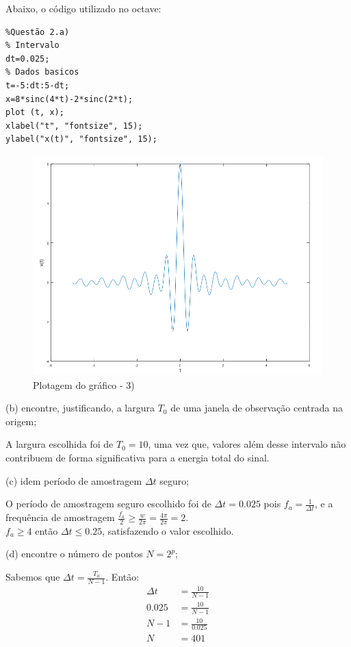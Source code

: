 \documentclass[10pt]{article}
\begin{document}
Abaixo, o código utilizado no octave:

\begin{verbatim}
%Questão 2.a)
% Intervalo
dt=0.025;
% Dados basicos
t=-5:dt:5-dt;
x=8*sinc(4*t)-2*sinc(2*t);
plot (t, x);
xlabel("t", "fontsize", 15);
ylabel("x(t)", "fontsize", 15);
\end{verbatim}

\begin{figure}[h]
    \includegraphics[scale=0.65]{questao3a}
    \centering
    \caption{Plotagem do gráfico - 3)}
\end{figure}

(b) encontre, justificando, a largura $T_0$ de uma janela de observação centrada na origem;

A largura escolhida foi de $T_0 = 10$, uma vez que, valores além desse intervalo
não contribuem de forma significativa para a energia total do sinal.
\vspace{\baselineskip}

(c) idem período de amostragem $\Delta t$ seguro;

O período de amostragem seguro escolhido foi de $\Delta{t} = 0.025$ pois $f_a = \frac{1}{\Delta{t}}$,
e a frequência de amostragem $\frac{f_a}{2} \ge \frac{w}{2\pi} = \frac{4\pi}{2\pi} = 2$.\\
$f_a \ge 4$ então $\Delta{t} \le 0.25$, satisfazendo o valor escolhido.
\vspace{\baselineskip}

(d) encontre o número de pontos $N = 2^p$;

Sabemos que $\Delta t = \frac{T_0}{N - 1}$. Então:
\begin{align*}
    \Delta t &= \frac{10}{N - 1}\\
    0.025 &= \frac{10}{N - 1}\\
    N - 1 &= \frac{10}{0.025}\\
    N &= 401
\end{align*}
\end{document}
